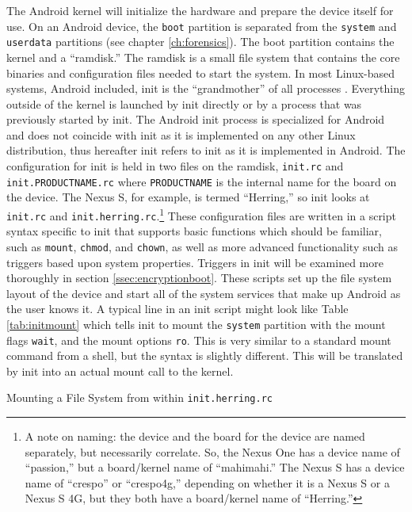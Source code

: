 The Android kernel will initialize the hardware and prepare the device itself for use. On an Android device, the \texttt{boot}
partition is separated from the \texttt{system} and \texttt{userdata} partitions (see chapter \ref{ch:forensics}). The boot
partition contains the kernel and a ``ramdisk.''  The ramdisk is a small file system that contains the core binaries and
configuration files needed to start the system. In most Linux-based systems, Android included, init is the ``grandmother'' of all
processes \cite{eneaboot}. Everything outside of the kernel is launched by init directly or by a process that was previously started
by init. The Android init process is specialized for Android and does not coincide with init as it is implemented on any other Linux
distribution, thus hereafter init refers to init as it is implemented in Android.  The configuration for init is held in two files
on the ramdisk, \texttt{init.rc} and \texttt{init.PRODUCTNAME.rc} where \texttt{PRODUCTNAME} is the internal name for the board on
the device. The Nexus S, for example, is termed ``Herring,'' so init looks at \texttt{init.rc} and
\texttt{init.herring.rc}.\footnote{A note on naming: the device and the board for the device are named separately, but necessarily
correlate. So, the Nexus One has a device name of ``passion,'' but a board/kernel name of ``mahimahi.'' The Nexus S has a device
name of ``crespo'' or ``crespo4g,'' depending on whether it is a Nexus S or a Nexus S 4G, but they both have a board/kernel name of
``Herring.''} These configuration files are written in a script syntax specific to init that supports basic functions which should
be familiar, such as \texttt{mount}, \texttt{chmod}, and \texttt{chown}, as well as more advanced functionality such as triggers
based upon system properties.  Triggers in init will be examined more thoroughly in section \ref{ssec:encryptionboot}. These scripts
set up the file system layout of the device and start all of the system services that make up Android as the user knows it. A
typical line in an init script might look like Table \ref{tab:initmount} which tells init to mount the \texttt{system} partition
with the mount flags \texttt{wait}, and the mount options \texttt{ro}. This is very similar to a standard mount command from a
shell, but the syntax is slightly different. This will be translated by init into an actual mount call to the kernel. 
\begin{table}[!htb]

\caption{Mounting a File System from within \texttt{init.herring.rc}}
\label{tab:initmount}
\end{table}


